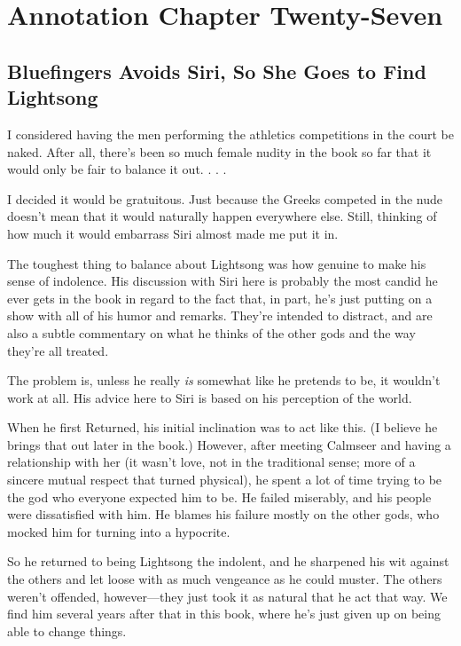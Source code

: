 \section{Annotation Chapter Twenty-Seven}

\subsection*{Bluefingers Avoids Siri, So She Goes to Find Lightsong}

I considered having the men performing the athletics competitions in the court be naked. After all, there’s been so much female nudity in the book so far that it would only be fair to balance it out. . . .

I decided it would be gratuitous. Just because the Greeks competed in the nude doesn’t mean that it would naturally happen everywhere else. Still, thinking of how much it would embarrass Siri almost made me put it in.

The toughest thing to balance about Lightsong was how genuine to make his sense of indolence. His discussion with Siri here is probably the most candid he ever gets in the book in regard to the fact that, in part, he’s just putting on a show with all of his humor and remarks. They’re intended to distract, and are also a subtle commentary on what he thinks of the other gods and the way they’re all treated.

The problem is, unless he really \textit{is} somewhat like he pretends to be, it wouldn’t work at all. His advice here to Siri is based on his perception of the world.

When he first Returned, his initial inclination was to act like this. (I believe he brings that out later in the book.) However, after meeting Calmseer and having a relationship with her (it wasn’t love, not in the traditional sense; more of a sincere mutual respect that turned physical), he spent a lot of time trying to be the god who everyone expected him to be. He failed miserably, and his people were dissatisfied with him. He blames his failure mostly on the other gods, who mocked him for turning into a hypocrite.

So he returned to being Lightsong the indolent, and he sharpened his wit against the others and let loose with as much vengeance as he could muster. The others weren’t offended, however—they just took it as natural that he act that way. We find him several years after that in this book, where he’s just given up on being able to change things.



